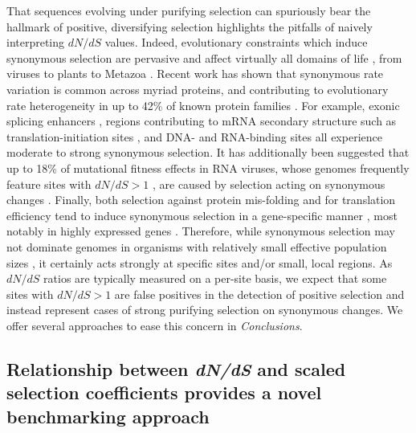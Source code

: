\documentclass[11pt]{article}
\begin{document}
That sequences evolving under purifying selection can spuriously bear the hallmark of positive, diversifying selection highlights the pitfalls of naively interpreting $dN/dS$ values. Indeed, evolutionary constraints which induce synonymous selection are pervasive and affect virtually all domains of life \citep{GuZhouWilke2010}, from viruses \citep{ZhouWilke2011,Cuevasetal2011,ZaniniNeher2013} to plants \citep{Guetal2012} to Metazoa \citep{Duret2002,Chamaryetal2006,HershbergPetrov2008,PlotkinKudla2010,Lawrieetal2013}. 
Recent work has shown that synonymous rate variation is common across myriad proteins, and contributing to evolutionary rate heterogeneity in up to 42\% of known protein families \citep{Dimitrieva2014}. For example, exonic splicing enhancers \citep{Schattner2006,Parmleyetal2006,ParmleyHurst2007}, regions contributing to mRNA secondary structure such as translation-initiation sites \citep{Chamaryetal2005,Schattner2006,GuZhouWilke2010,Cuevasetal2011,ZaniniNeher2013}, and DNA- and RNA-binding sites \citep{Parmleyetal2006} all experience moderate to strong synonymous selection. It has additionally been suggested that up to 18\% of mutational fitness effects in RNA viruses, whose genomes frequently feature sites with $dN/dS > 1$ \citep{Bushetal1999,Suzuki2006,Bhattetal2011,Meyeretal2013,MeyerWilke2013}, are caused by selection acting on synonymous changes \citep{Cuevasetal2011}. Finally, both selection against protein mis-folding and for translation efficiency tend to induce synonymous selection in a gene-specific manner \citep{WillifordDemuth2012,Agasheetal2013}, most notably in highly expressed genes \citep{DrummondWilke2008,Lawrieetal2013}. Therefore, while synonymous selection may not dominate genomes in organisms with relatively small effective population sizes \citep{Chamaryetal2006, PlotkinKudla2010}, it certainly acts strongly at specific sites and/or small, local regions. As $dN/dS$ ratios are typically measured on a per-site basis, we expect that some sites with $dN/dS > 1$ are false positives in the detection of positive selection and instead represent cases of strong purifying selection on synonymous changes. We offer several approaches to ease this concern in \emph{Conclusions}.



\subsection*{Relationship between \emph{dN/dS} and scaled selection coefficients provides a novel benchmarking approach}
\end{document}
